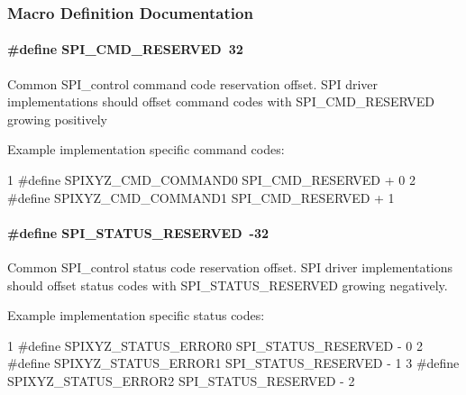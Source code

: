 \subsubsection{Macro Definition Documentation}
\paragraph[{S\+P\+I\+\_\+\+C\+M\+D\+\_\+\+R\+E\+S\+E\+R\+V\+E\+D}]{\setlength{\rightskip}{0pt plus 5cm}\#define S\+P\+I\+\_\+\+C\+M\+D\+\_\+\+R\+E\+S\+E\+R\+V\+E\+D~32}\label{group___s_p_i___c_o_n_t_r_o_l_ga3d23d16525ee76f77276472d8dea80b0}
Common S\+P\+I\+\_\+control command code reservation offset. S\+P\+I driver implementations should offset command codes with S\+P\+I\+\_\+\+C\+M\+D\+\_\+\+R\+E\+S\+E\+R\+V\+E\+D growing positively

Example implementation specific command codes\+: 
\begin{DoxyCode}
1 #define SPIXYZ\_CMD\_COMMAND0     SPI\_CMD\_RESERVED + 0
2 #define SPIXYZ\_CMD\_COMMAND1     SPI\_CMD\_RESERVED + 1
\end{DoxyCode}
\paragraph[{S\+P\+I\+\_\+\+S\+T\+A\+T\+U\+S\+\_\+\+R\+E\+S\+E\+R\+V\+E\+D}]{\setlength{\rightskip}{0pt plus 5cm}\#define S\+P\+I\+\_\+\+S\+T\+A\+T\+U\+S\+\_\+\+R\+E\+S\+E\+R\+V\+E\+D~-\/32}\label{group___s_p_i___c_o_n_t_r_o_l_gae1af8c6ebf5e8fe481649f65e37b1b9f}
Common S\+P\+I\+\_\+control status code reservation offset. S\+P\+I driver implementations should offset status codes with S\+P\+I\+\_\+\+S\+T\+A\+T\+U\+S\+\_\+\+R\+E\+S\+E\+R\+V\+E\+D growing negatively.

Example implementation specific status codes\+: 
\begin{DoxyCode}
1 #define SPIXYZ\_STATUS\_ERROR0    SPI\_STATUS\_RESERVED - 0
2 #define SPIXYZ\_STATUS\_ERROR1    SPI\_STATUS\_RESERVED - 1
3 #define SPIXYZ\_STATUS\_ERROR2    SPI\_STATUS\_RESERVED - 2
\end{DoxyCode}
 